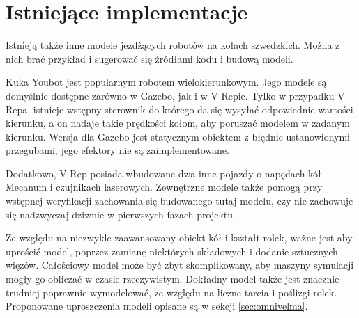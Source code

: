 \section{Istniejące implementacje}
	Istnieją także inne modele jeżdżących robotów na kołach szwedzkich.
	Można z nich brać przykład i sugerować się źródłami kodu i budową modeli.

	Kuka Youbot jest popularnym robotem wielokierunkowym. Jego modele są domyślnie dostępne zarówno w Gazebo, jak i w V-Repie.
	Tylko w przypadku V-Repa, istnieje wstępny sterownik do którego da się wysyłać odpowiednie wartości kierunku, a on nadaje takie prędkości kołom, aby poruszać modelem w zadanym kierunku.
	Wersja dla Gazebo jest statycznym obiektem z błędnie ustanowionymi przegubami, jego efektory nie są zaimplementowane.
	
	Dodatkowo, V-Rep posiada wbudowane dwa inne pojazdy o napędach kół Mecanum i czujnikach laserowych.
	Zewnętrzne modele także pomogą przy wstępnej weryfikacji zachowania się budowanego tutaj modelu, czy nie zachowuje się nadzwyczaj dziwnie w pierwszych fazach projektu.

	Ze względu na niezwykle zaawansowany obiekt kół i kształt rolek, ważne jest aby uprościć model, poprzez zamianę niektórych składowych i dodanie sztucznych więzów.
	Całościowy model może być zbyt skomplikowany, aby maszyny symulacji mogły go obliczać w czasie rzeczywistym.
	Dokładny model także jest znacznie trudniej poprawnie wymodelować, ze względu na liczne tarcia i poślizgi rolek.
	Proponowane uproszczenia modeli opisane są w sekcji \ref{sec:omnivelma}.
